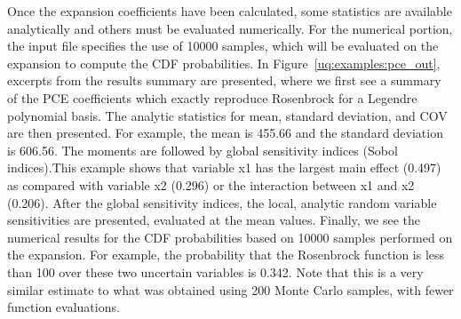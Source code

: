 Once the expansion coefficients have been calculated, some statistics
are available analytically and others must be evaluated numerically.
For the numerical portion, the input file specifies the use of 10000
samples, which will be evaluated on the expansion to compute the CDF
probabilities. In Figure~\ref{uq:examples:pce_out}, excerpts from the results
summary are presented, where we first see a summary of the PCE
coefficients which exactly reproduce Rosenbrock for a Legendre
polynomial basis. The analytic statistics for mean, standard
deviation, and COV are then presented. For example, the mean is 455.66 
and the standard deviation is 606.56. The moments are followed 
by global sensitivity indices (Sobol indices).This example shows that variable 
x1 has the largest main effect (0.497) as compared with variable 
x2 (0.296) or the interaction between x1 and x2 (0.206). 
After the global sensitivity indices, the local, analytic random 
variable sensitivities are presented, evaluated at the mean values.
Finally, we see the numerical results for the CDF probabilities based
on 10000 samples performed on the expansion. For example, 
the probability that the Rosenbrock function is less than 100 
over these two uncertain variables is 0.342. Note that this is a very similar 
estimate to what was obtained using 200 Monte Carlo samples, with 
fewer function evaluations.
